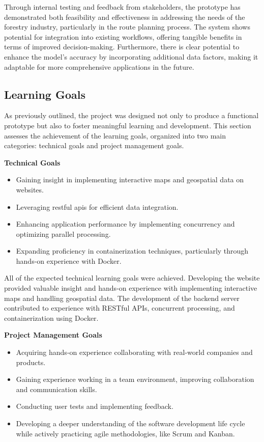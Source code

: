 Through internal testing and feedback from stakeholders, the prototype has demonstrated both feasibility and effectiveness in addressing the needs of the forestry industry, particularly in the route planning process. The system shows potential for integration into existing workflows, offering tangible benefits in terms of improved decision-making. Furthermore, there is clear potential to enhance the model's accuracy by incorporating additional data factors, making it adaptable for more comprehensive applications in the future.

\subsection{Learning Goals}

As previously outlined, the project was designed not only to produce a functional prototype but also to foster meaningful learning and development. This section assesses the achievement of the learning goals, organized into two main categories: technical goals and project management goals.

\textbf{Technical Goals}

\begin{itemize}
    \item Gaining insight in implementing interactive maps and geospatial data on websites.
    \item Leveraging \acrshort{rest}ful \acrshort{api}s for efficient data integration.
    \item Enhancing application performance by implementing concurrency and optimizing parallel processing.
    \item Expanding proficiency in containerization techniques, particularly through hands-on experience with Docker.
\end{itemize}

All of the expected technical learning goals were achieved. Developing the website provided valuable insight and hands-on experience with implementing interactive maps and handling geospatial data. The development of the backend server contributed to experience with RESTful APIs, concurrent processing, and containerization using Docker.

\textbf{Project Management Goals}

\begin{itemize}
    \item Acquiring hands-on experience collaborating with real-world companies and products.
    \item Gaining experience working in a team environment, improving collaboration and communication skills.
    \item Conducting user tests and implementing feedback. 
    \item Developing a deeper understanding of the software development life cycle while actively practicing agile methodologies, like Scrum and Kanban.
\end{itemize}

